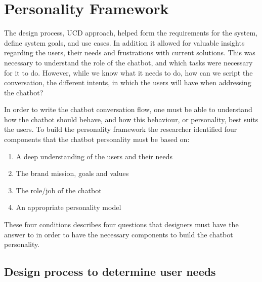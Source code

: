 \section{Personality Framework}

The design process, UCD approach, helped form the requirements for the system, define system goals, and use cases. In addition it allowed for valuable insights regarding the users, their needs and frustrations with current solutions. This was necessary to understand the role of the chatbot, and which tasks were necessary for it to do. However, while we know what it needs to do, how can we script the conversation, the different intents, in which the users will have when addressing the chatbot? 

In order to write the chatbot conversation flow, one must be able to understand how the chatbot should behave, and how this behaviour, or personality, best suits the users. To build the personality framework the researcher identified four components that the chatbot personality must be based on:

\begin{enumerate}
    \item A deep understanding of the users and their needs %
    \item The brand mission, goals and values
    \item The role/job of the chatbot
    \item An appropriate personality model
\end{enumerate}

These four conditions describes four questions that designers must have the answer to in order to have the necessary components to build the chatbot personality.

\vspace{5mm} %

\subsection{Design process to determine user needs}


